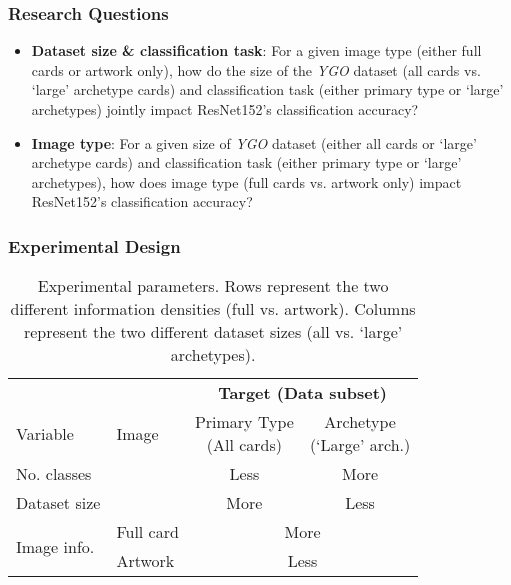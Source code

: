 \documentclass[11pt]{beamer}
\begin{document}
%
%

\begin{frame}
	\frametitle{Research Questions}
	\pause
	\begin{itemize}
		\item \textbf{Dataset size \& classification task}: For a given image type (either full cards or artwork only), how do the size of the \textit{YGO} dataset (all cards vs. `large' archetype cards) and classification task (either primary type or `large' archetypes) jointly impact ResNet152's classification accuracy?
	\pause
		\item \textbf{Image type}: For a given size of \textit{YGO} dataset (either all cards or `large' archetype cards) and classification task (either primary type or `large' archetypes), how does image type (full cards vs. artwork only) impact ResNet152's classification accuracy?
	\end{itemize}
\end{frame}

\begin{frame}
	\frametitle{Experimental Design}

\begin{table}[h]
	\begin{center}
		\begin{tabular}{ l  l | c | c |}
			& \multicolumn{1}{r}{} & \multicolumn{2}{c}{\textbf{Target (Data subset)}} \\
			\cmidrule{3-4}
			Variable & Image & \shortstack{Primary Type\\(All cards)} & \shortstack{Archetype\\(`Large' arch.)} \\
			\midrule
			No. classes & \multirow{2}{*}{} & Less & More \\
			Dataset size && More & Less \\
			\midrule
			\multirow{2}{*}{Image info.} & Full card & \multicolumn{2}{c|}{More}\\
			\cmidrule{2-4}
			& Artwork & \multicolumn{2}{c|}{Less}\\
			\bottomrule
		\end{tabular}
	\vspace*{0.25cm}
	\caption{Experimental parameters. Rows represent the two different information densities (full vs. artwork). Columns represent the two different dataset sizes (all vs. `large' archetypes).}
	\label{tab:exp}
	\end{center}
\end{table}

\end{frame}
\end{document}
